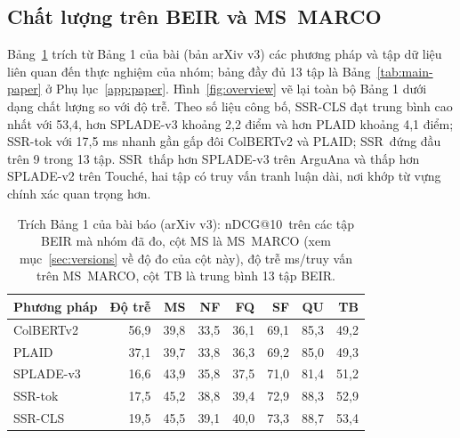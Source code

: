 \documentclass[a4paper,13pt]{extreport}
\makeatletter
\theoremstyle{plain}
\newcommand{\ssr}{SSR}
\newcommand{\ndcg}{nDCG@10}
\makeatother
\begin{document}
\subsection{Chất lượng trên BEIR và MS~MARCO}
Bảng~\ref{tab:main-summary} trích từ Bảng 1 của bài (bản arXiv v3) các phương pháp và tập dữ liệu liên quan đến thực nghiệm của nhóm; bảng đầy đủ 13 tập là Bảng~\ref{tab:main-paper} ở Phụ lục~\ref{app:paper}. Hình~\ref{fig:overview} vẽ lại toàn bộ Bảng 1 dưới dạng chất lượng so với độ trễ. Theo số liệu công bố, \ssr-CLS đạt trung bình cao nhất với 53,4, hơn SPLADE-v3 khoảng 2,2 điểm và hơn PLAID khoảng 4,1 điểm; \ssr-tok với 17,5 ms nhanh gần gấp đôi ColBERTv2 và PLAID; \ssr\ đứng đầu trên 9 trong 13 tập. \ssr\ thấp hơn SPLADE-v3 trên ArguAna và thấp hơn SPLADE-v2 trên Touché, hai tập có truy vấn tranh luận dài, nơi khớp từ vựng chính xác quan trọng hơn.

\begin{table}[htbp]
\centering
\caption[Bảng 1 của bài báo (trích)]{Trích Bảng 1 của bài báo (arXiv v3): \ndcg\ trên các tập BEIR mà nhóm đã đo, cột MS là MS~MARCO (xem mục~\ref{sec:versions} về độ đo của cột này), độ trễ ms/truy vấn trên MS~MARCO, cột TB là trung bình 13 tập BEIR.}
\label{tab:main-summary}
\small
\begin{tabular}{lrrrrrrr}
\toprule
\textbf{Phương pháp} & \textbf{Độ trễ} & \textbf{MS} & \textbf{NF} & \textbf{FQ} & \textbf{SF} & \textbf{QU} & \textbf{TB}\\
\midrule
ColBERTv2 & 56,9 & 39,8 & 33,5 & 36,1 & 69,1 & 85,3 & 49,2\\
PLAID & 37,1 & 39,7 & 33,8 & 36,3 & 69,2 & 85,0 & 49,3\\
SPLADE-v3 & 16,6 & 43,9 & 35,8 & 37,5 & 71,0 & 81,4 & 51,2\\
\ssr-tok & 17,5 & 45,2 & 38,8 & 39,4 & 72,9 & 88,3 & 52,9\\
\ssr-CLS & 19,5 & 45,5 & 39,1 & 40,0 & 73,3 & 88,7 & 53,4\\
\bottomrule
\end{tabular}
\end{table}
\end{document}
